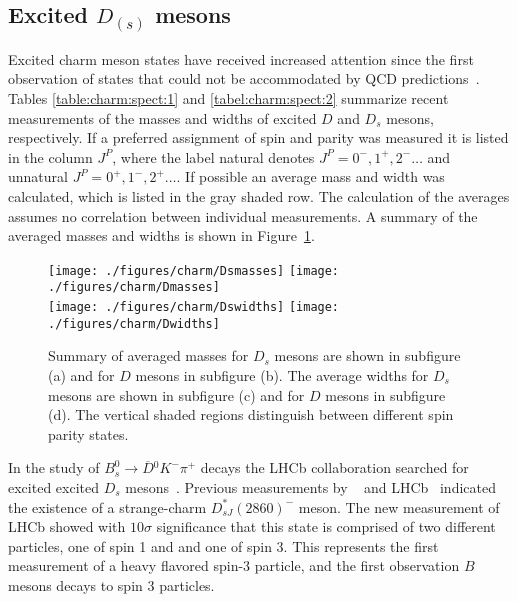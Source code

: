\subsection{Excited \emph{$D_{(s)}$} mesons}
Excited charm meson states have received increased attention since the first observation of states that could not be accommodated by QCD predictions~\cite{Aubert:2003fg,
Besson:2003cp,Abe:2003jk,Aubert:2003pe}. Tables \ref{table:charm:spect:1} and \ref{tabel:charm:spect:2} summarize recent measurements of the masses and widths of excited $D$ and $D_{s}$ mesons, respectively. If a preferred assignment of spin and parity was measured it is listed in the column $J^{P}$, where the label natural denotes $J^{P}=0^{-},1^{+},2^{-}\ldots$ and unnatural $J^{P}=0^{+},1^{-},2^{+}\ldots$. If possible an average mass and width was calculated, which is listed in the gray shaded row. The calculation of the averages assumes no correlation between individual measurements. A summary of the averaged masses and widths is shown in Figure~\ref{fig:charm:spect:1}. 
\begin{figure}[htb!]
\begin{centering}
\texttt{[image: ./figures/charm/Dsmasses]}
\quad
\texttt{[image: ./figures/charm/Dmasses]}\\
\texttt{[image: ./figures/charm/Dswidths]}
\quad
\texttt{[image: ./figures/charm/Dwidths]}

\caption{\label{fig:charm:spect:1}  Summary of averaged masses for $D_{s}$ mesons are shown in subfigure (a) and for $D$ mesons in subfigure (b). The average widths for $D_{s}$ mesons are shown in subfigure (c) and for $D$ mesons in subfigure (d). The vertical shaded regions distinguish between different spin parity states.}
\end{centering}
\end{figure}

In the study of $B_{s}^{0}\to \overline{D}{}^{0}K^{-}\pi^{+}$ decays the LHCb collaboration searched for excited excited  $D_{s}$ mesons~\cite{Aaij:2014xza}.  Previous measurements by \babar{}~\cite{Aubert:2009ah} and LHCb~\cite{Aaij:2012pc} indicated the existence of a strange-charm $D^{*}_{sJ}(2860)^{-}$ meson. The new measurement of LHCb showed with $10\sigma$ significance that this state is comprised of two different particles,  one of spin 1 and and one of spin 3. This represents the first measurement of a heavy flavored spin-3 particle, and the first observation $B$ mesons decays to spin 3 particles.

